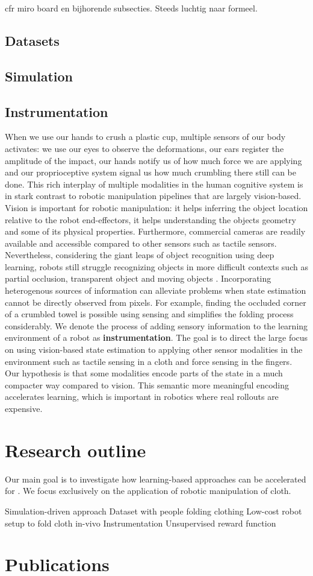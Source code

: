 \documentclass[\home/main.tex]{subfiles}
\begin{document}
cfr miro board en bijhorende subsecties. Steeds luchtig naar formeel.


\subsection{Datasets}
\subsection{Simulation}
\subsection{Instrumentation}
When we use our hands to crush a plastic cup, multiple sensors of our body activates: we use our eyes to observe the deformations, our ears register the amplitude of the impact, our hands notify us of how much force we are applying and our proprioceptive system signal us how much crumbling there still can be done. This rich interplay of multiple modalities in the human cognitive system is in stark contrast to robotic manipulation pipelines that are largely vision-based.  Vision is important for robotic manipulation: it helps inferring the object location relative to the robot end-effectors, it helps understanding the objects geometry and some of its physical properties. Furthermore, commercial cameras are readily available and accessible compared to other sensors such as tactile sensors. Nevertheless, considering the giant leaps of object recognition using deep learning, robots still struggle recognizing objects in more difficult contexts such as partial occlusion, transparent object and moving objects \autocite{Guo2014,sajjan2019cleargrasp,Ojha2015}. 
Incorporating heterogenous sources of information can alleviate problems when state estimation cannot be directly observed from pixels. For example, finding the occluded corner of a crumbled towel is possible using sensing and simplifies the folding process considerably. 
We denote the process of adding sensory information to the learning environment of a robot as \textbf{instrumentation}. The goal is to direct the large focus on using vision-based state estimation to applying other sensor modalities in the environment such as tactile sensing in a cloth and force sensing in the fingers. Our hypothesis is that some modalities encode parts of the state in a much compacter way compared to vision. This semantic more meaningful encoding accelerates learning, which is important in robotics where real rollouts are expensive. 

\section{Research outline}
Our main goal is to investigate how learning-based approaches can be accelerated for . We focus exclusively on the application of robotic manipulation of cloth.

Simulation-driven approach
Dataset with people folding clothing
Low-cost robot setup to fold cloth in-vivo
Instrumentation
Unsupervised reward function

\section{Publications}
\end{document}
